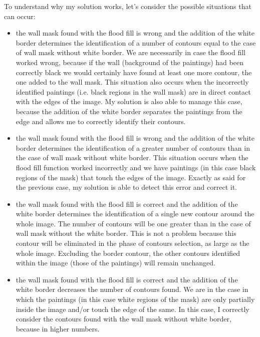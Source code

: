 \documentclass[10pt,twocolumn,letterpaper]{article}
\begin{document}
To understand why my solution works, let's consider the possible situations that can occur:
\begin{itemize}
   \item the wall mask found with the flood fill is wrong and the addition of the white border determines the identification of a number of contours equal to the case of wall mask without white border. We are necessarily in case the flood fill worked wrong, because if the wall (background of the paintings) had been correctly black we would certainly have found at least one more contour, the one added to the wall mask. This situation also occurs when the incorrectly identified paintings (i.e. black regions in the wall mask) are in direct contact with the edges of the image. My solution is also able to manage this case, because the addition of the white border separates the paintings from the edge and allows me to correctly identify their contours.
   
   \item the wall mask found with the flood fill is wrong and the addition of the white border determines the identification of a greater number of contours than in the case of wall mask without white border. This situation occurs when the flood fill function  worked incorrectly and we have paintings (in this case black regions of the mask) that touch the edges of the image. Exactly as said for the previous case, my solution is able to detect this error and correct it.

   \item the wall mask found with the flood fill is correct and the addition of the white border determines the identification of a single new contour around the whole image. The number of contours will be one greater than in the case of wall mask without the white border. This is not a problem because this contour will be eliminated in the phase of contours selection, as large as the whole image. Excluding the border contour, the other contours identified within the image (those of the paintings) will remain unchanged.
   
   \item the wall mask found with the flood fill is correct and the addition of the white border decreases the number of contours found. We are in the case in which the paintings (in this case white regions of the mask) are only partially inside the image and/or touch the edge of the same. In this case, I correctly consider the contours found with the wall mask without white border, because in higher numbers. 
\end{itemize}
\end{document}
